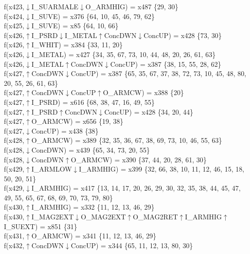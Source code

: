 f(x423,$\downarrow$I\_SUARMALE$\downarrow$O\_ARMHIG) = x487 \{29, 30\} \\  
f(x424,$\downarrow$I\_SUVE) = x376 \{64, 10, 45, 46, 79, 62\} \\  
f(x425,$\downarrow$I\_SUVE) = x85 \{64, 10, 66\} \\  
f(x426,$\uparrow$I\_PSRD$\downarrow$I\_METAL$\uparrow$ConcDWN$\downarrow$ConcUP) = x428 \{73, 30\} \\  
f(x426,$\uparrow$I\_WHIT) = x384 \{33, 11, 20\} \\  
f(x426,$\downarrow$I\_METAL) = x427 \{34, 35, 67, 73, 10, 44, 48, 20, 26, 61, 63\} \\  
f(x426,$\downarrow$I\_METAL$\uparrow$ConcDWN$\downarrow$ConcUP) = x387 \{38, 15, 55, 28, 62\} \\  
f(x427,$\uparrow$ConcDWN$\downarrow$ConcUP) = x387 \{65, 35, 67, 37, 38, 72, 73, 10, 45, 48, 80, 20, 55, 26, 61, 63\} \\  
f(x427,$\uparrow$ConcDWN$\downarrow$ConcUP$\uparrow$O\_ARMCW) = x388 \{20\} \\  
f(x427,$\uparrow$I\_PSRD) = x616 \{68, 38, 47, 16, 49, 55\} \\  
f(x427,$\uparrow$I\_PSRD$\uparrow$ConcDWN$\downarrow$ConcUP) = x428 \{34, 20, 44\} \\  
f(x427,$\uparrow$O\_ARMCW) = x656 \{19, 38\} \\  
f(x427,$\downarrow$ConcUP) = x438 \{38\} \\  
f(x428,$\uparrow$O\_ARMCW) = x389 \{32, 35, 36, 67, 38, 69, 73, 10, 46, 55, 63\} \\  
f(x428,$\downarrow$ConcDWN) = x439 \{65, 34, 73, 20, 55\} \\  
f(x428,$\downarrow$ConcDWN$\uparrow$O\_ARMCW) = x390 \{37, 44, 20, 28, 61, 30\} \\  
f(x429,$\uparrow$I\_ARMLOW$\downarrow$I\_ARMHIG) = x399 \{32, 66, 38, 10, 11, 12, 46, 15, 18, 50, 20, 51\} \\  
f(x429,$\downarrow$I\_ARMHIG) = x417 \{13, 14, 17, 20, 26, 29, 30, 32, 35, 38, 44, 45, 47, 49, 55, 65, 67, 68, 69, 70, 73, 79, 80\} \\  
f(x430,$\uparrow$I\_ARMHIG) = x332 \{11, 12, 13, 46, 29\} \\  
f(x430,$\uparrow$I\_MAG2EXT$\downarrow$O\_MAG2EXT$\uparrow$O\_MAG2RET$\uparrow$I\_ARMHIG$\uparrow$I\_SUEXT) = x851 \{31\} \\  
f(x431,$\uparrow$O\_ARMCW) = x341 \{11, 12, 13, 46, 29\} \\  
f(x432,$\uparrow$ConcDWN$\downarrow$ConcUP) = x344 \{65, 11, 12, 13, 80, 30\} \\  
